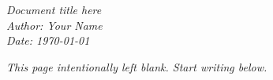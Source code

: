 \documentclass[12pt]{article}
\theoremstyle{remark}
\newcommand{\todayYYMMDD}{\the\year-\the\month-\the\day}
\begin{document}
\hfill
\begin{center}
\textit{Document title here}\\
\textit{Author: Your Name}\\
\textit{Date: \today}
\end{center}

\tableofcontents
\newpage 

\vspace*{\fill}
\begin{center}
\textit{This page intentionally left blank. Start writing below.}
\end{center}
\vspace*{\fill}
\end{document}
